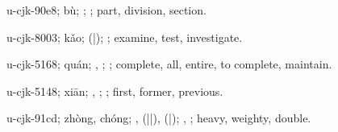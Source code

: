 \begin{multicols}{2}
{\cjkgGlue{}u-cjk-90e8; bù; \cjkgGlue{}; \cjkgGlue{}; part, division, section.

\cjkgGlue{}u-cjk-8003; kǎo; \cjkgGlue{}\cjkgGlue{}(\cjkgGlue{}|\cjkgGlue{}); \cjkgGlue{}; examine, test, investigate.

\cjkgGlue{}u-cjk-5168; quán; \cjkgGlue{}\cjkgGlue{}\cjkgGlue{}, \cjkgGlue{}\cjkgGlue{}\cjkgGlue{}; \cjkgGlue{}; complete, all, entire, to complete, maintain.

\cjkgGlue{}u-cjk-5148; xiān; \cjkgGlue{}, \cjkgGlue{}\cjkgGlue{}\cjkgGlue{}; \cjkgGlue{}; first, former, previous.

\cjkgGlue{}u-cjk-91cd; zhòng, chóng; \cjkgGlue{}, \cjkgGlue{}\cjkgGlue{}(\cjkgGlue{}|\cjkgGlue{}|\cjkgGlue{}), \cjkgGlue{}\cjkgGlue{}(\cjkgGlue{}|\cjkgGlue{}); \cjkgGlue{}, \cjkgGlue{}; heavy, weighty, double.

}
\end{multicols}
